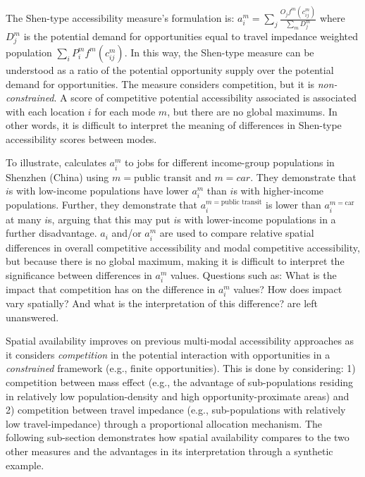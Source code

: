 \documentclass[]{trbunofficial}
\begin{document}
The Shen-type accessibility measure's formulation is:
\(a_i^m = \sum_j \frac{O_jf^m(c_{ij}^m)}{\sum_m D_j^m}\) where \(D_j^m\)
is the potential demand for opportunities equal to travel impedance
weighted population \(\sum_i P_i^m f^m(c_{ij}^m)\). In this way, the
Shen-type measure can be understood as a ratio of the potential
opportunity supply over the potential demand for opportunities. The
measure considers competition, but it is \emph{non-constrained}. A score
of competitive potential accessibility associated is associated with
each location \(i\) for each mode \(m\), but there are no global
maximums. In other words, it is difficult to interpret the meaning of
differences in Shen-type accessibility scores between modes.

To illustrate, \citet{taoInvestigatingImpactsPublic2020a} calculates
\(a_i^m\) to jobs for different income-group populations in Shenzhen
(China) using \(m = \text{public transit}\) and \(m={car}\). They
demonstrate that \(i\)s with low-income populations have lower \(a_i^m\)
than \(i\)s with higher-income populations. Further, they demonstrate
that \(a_i^{m=\text{public transit}}\) is lower than
\(a_i^{m=\text{car}}\) at many \(i\)s, arguing that this may put \(i\)s
with lower-income populations in a further disadvantage. \(a_i\) and/or
\(a_i^m\) are used to compare relative spatial differences in overall
competitive accessibility and modal competitive accessibility, but
because there is no global maximum, making it is difficult to interpret
the significance between differences in \(a_i^{m}\) values. Questions
such as: What is the impact that competition has on the difference in
\(a_i^m\) values? How does impact vary spatially? And what is the
interpretation of this difference? are left unanswered.

Spatial availability improves on previous multi-modal accessibility
approaches as it considers \emph{competition} in the potential
interaction with opportunities in a \emph{constrained} framework (e.g.,
finite opportunities). This is done by considering: 1) competition
between mass effect (e.g., the advantage of sub-populations residing in
relatively low population-density and high opportunity-proximate areas)
and 2) competition between travel impedance (e.g., sub-populations with
relatively low travel-impedance) through a proportional allocation
mechanism. The following sub-section demonstrates how spatial
availability compares to the two other measures and the advantages in
its interpretation through a synthetic example.
\end{document}
